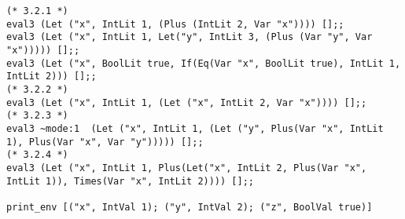 \documentclass[a4paper,9pt]{jarticle}
\begin{document}
\begin{lstlisting}
(* 3.2.1 *)
eval3 (Let ("x", IntLit 1, (Plus (IntLit 2, Var "x")))) [];;
eval3 (Let ("x", IntLit 1, Let("y", IntLit 3, (Plus (Var "y", Var "x"))))) [];;
eval3 (Let ("x", BoolLit true, If(Eq(Var "x", BoolLit true), IntLit 1, IntLit 2))) [];;
(* 3.2.2 *)
eval3 (Let ("x", IntLit 1, (Let ("x", IntLit 2, Var "x")))) [];;
(* 3.2.3 *)
eval3 ~mode:1  (Let ("x", IntLit 1, (Let ("y", Plus(Var "x", IntLit 1), Plus(Var "x", Var "y"))))) [];;
(* 3.2.4 *)
eval3 (Let ("x", IntLit 1, Plus(Let("x", IntLit 2, Plus(Var "x", IntLit 1)), Times(Var "x", IntLit 2)))) [];;

print_env [("x", IntVal 1); ("y", IntVal 2); ("z", BoolVal true)]

\end{lstlisting}
\end{document}
